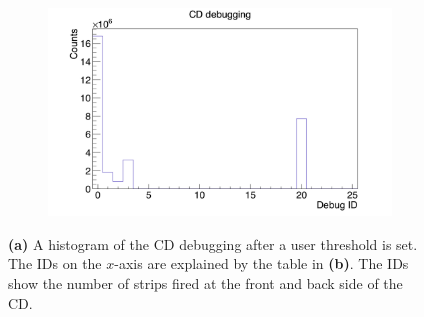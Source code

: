 \documentclass[twoside,english]{uiofysmaster/uiofysmaster}
\begin{document}
\begin{figure}[htb]
	\centering
	\begin{subfigure}[b]{0.49\textwidth}
		\centering
		\includegraphics[width=\textwidth]{../Plots/plotting/cd_debug-user.png}
		\caption{}
		\label{fig:CD_debug}
	\end{subfigure}
	\hfill
	\begin{subfigure}[b]{0.49\textwidth}
		\centering
    		 \newline %
    		\caption{}
    		\label{fig:CD_debug_table}
	\end{subfigure}
	\caption{\textbf{(a)} A histogram of the CD debugging after a user threshold is set. The IDs on the $x$-axis are explained by the table in \textbf{(b)}. The IDs show the number of strips fired at the front and back side of the CD.}
	\label{fig:CD_debug_both}
\end{figure}
\end{document}
